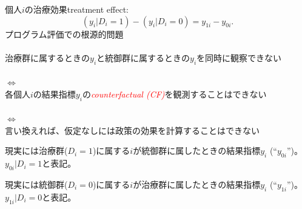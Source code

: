 \begin{frame}{}
個人$i$の治療効果treatment effect:
\[
(y_{i}|D_{i}=1)-(y_{i}|D_{i}=0)=
y_{1i}-y_{0i}.
\]
プログラム評価での根源的問題\\~\\
\pause
治療群に属するときの$y_{i}$と統御群に属するときの$y_{i}$を同時に観察できない\\~\\
\pause
\hfil$\Leftrightarrow$\\
各個人$i$の結果指標$y_{i}$の\textcolor{red}{\textit{counterfactual (CF)}}を観測することはできない\\~\\
\pause
\hfil$\Leftrightarrow$\\
言い換えれば、仮定なしには政策の効果を計算することはできない
\pause
\begin{description}
\vspace{3.0ex}\setlength{\itemsep}{1.0ex}\setlength{\baselineskip}{12pt}
\item[$y_{i}|D_{i}=1$のCF] %
現実には治療群($D_{i}=1$)に属する$i$が統御群に属したときの結果指標$y_{i}$ (``$y_{0i}$'')。$y_{0i}|D_{i}=1$と表記。
\item[$y_{i}|D_{i}=0$のCF] %
現実には統御群($D_{i}=0$)に属する$i$が治療群に属したときの結果指標$y_{i}$ (``$y_{1i}$'')。$y_{1i}|D_{i}=0$と表記。
\end{description}
\vspace{1.0ex}
\end{frame}

